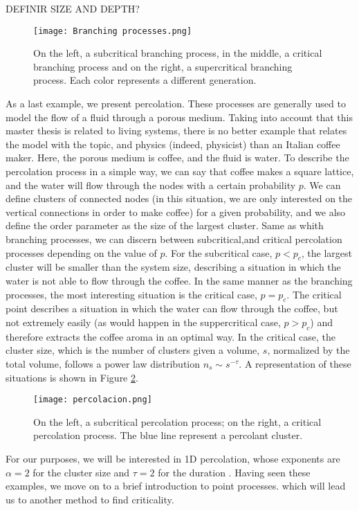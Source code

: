 DEFINIR SIZE AND DEPTH?

\begin{figure}[H]
    \centering
    \texttt{[image: Branching processes.png]}
    \caption{On the left, a subcritical branching process, in the middle, a critical branching process and on the right, a supercritical branching process. Each color represents a different
    generation.}
    \label{f:branching_processes}   
\end{figure}

As a last example, we present percolation. These processes are generally used to model the flow of a fluid through a porous medium. Taking into account that this master 
thesis is related to living systems, there is no better example that relates the model with the topic, and physics (indeed, physicist) than an Italian coffee maker. Here, the porous 
medium is coffee, and the fluid is water. To describe the percolation process in a simple way, we can say that coffee makes a square lattice, and the water will flow through the nodes 
with a certain probability $p$. We can define clusters of connected nodes (in this situation, we are only interested on the vertical connections in order to make coffee)
for a given probability, and we also define the order parameter as the size of the largest cluster. 
Same as whith branching processes, we can discern between subcritical,and critical percolation processes depending on the value of $p$. For the subcritical case, $p<p_c$,
the largest cluster will be smaller than the system size, describing a situation in which the water is not able to flow through the coffee. 
In the same manner as the branching processes, the most interesting situation is the critical case, $p=p_c$. The critical point describes a situation in which the water can flow through the
coffee, but not extremely easily (as would happen in the suppercritical case, $p>p_c$) and therefore extracts the coffee aroma in an optimal way. In the critical case, the cluster size, which 
is the number of clusters given a volume, $s$, normalized by the total volume, follows a power law distribution $n_s\sim s^{-\tau}$.
A representation of these situations is shown in Figure \ref{f:percolation}.

\begin{figure}[H]
    \centering
    \texttt{[image: percolacion.png]}
    \caption{On the left, a subcritical percolation process; on the right, a critical percolation process. The blue line represent a percolant cluster.}
    \label{f:percolation}
\end{figure}
For our purposes, we will be interested in 1D percolation, whose exponents are $\alpha=2$ for the cluster size and $\tau=2$ for the duration \cite{stauffer2018introduction}. 
Having seen these examples, we move on to a brief introduction to point processes. which will lead us to another method to find criticality.

